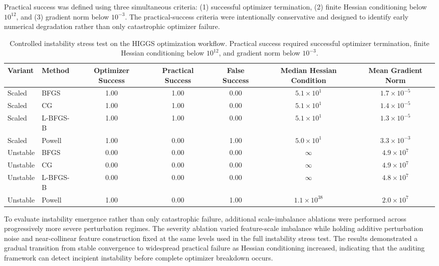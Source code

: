 Practical success was defined using three simultaneous criteria: (1) successful optimizer termination, (2) finite Hessian conditioning below \(10^{12}\), and (3) gradient norm below \(10^{-3}\). The practical-success criteria were intentionally conservative and designed to identify early numerical degradation rather than only catastrophic optimizer failure.

\begin{table}
\centering
\small
\begin{tabular}{l l c c c c c}
\hline
\textbf{Variant} &
\textbf{Method} &
\textbf{Optimizer Success} &
\textbf{Practical Success} &
\textbf{False Success} &
\textbf{Median Hessian Condition} &
\textbf{Mean Gradient Norm} \\
\hline

Scaled & BFGS &
1.00 & 1.00 & 0.00 &
$5.1\times10^{1}$ &
$1.7\times10^{-5}$ \\

Scaled & CG &
1.00 & 1.00 & 0.00 &
$5.1\times10^{1}$ &
$1.4\times10^{-5}$ \\

Scaled & L-BFGS-B &
1.00 & 1.00 & 0.00 &
$5.1\times10^{1}$ &
$1.3\times10^{-5}$ \\

Scaled & Powell &
1.00 & 0.00 & 1.00 &
$5.0\times10^{1}$ &
$3.3\times10^{-3}$ \\

Unstable & BFGS &
0.00 & 0.00 & 0.00 &
$\infty$ &
$4.9\times10^{7}$ \\

Unstable & CG &
0.00 & 0.00 & 0.00 &
$\infty$ &
$4.9\times10^{7}$ \\

Unstable & L-BFGS-B &
0.00 & 0.00 & 0.00 &
$\infty$ &
$4.8\times10^{7}$ \\

Unstable & Powell &
1.00 & 0.00 & 1.00 &
$1.1\times10^{38}$ &
$2.0\times10^{7}$ \\

\hline
\end{tabular}
\caption{Controlled instability stress test on the HIGGS optimization workflow. Practical success required successful optimizer termination, finite Hessian conditioning below \(10^{12}\), and gradient norm below \(10^{-3}\).}
\label{tab:higgs_instability}
\end{table}

To evaluate instability emergence rather than only catastrophic failure, additional scale-imbalance ablations were performed across progressively more severe perturbation regimes. The severity ablation varied feature-scale imbalance while holding additive perturbation noise and near-collinear feature construction fixed at the same levels used in the full instability stress test. The results demonstrated a gradual transition from stable convergence to widespread practical failure as Hessian conditioning increased, indicating that the auditing framework can detect incipient instability before complete optimizer breakdown occurs.

